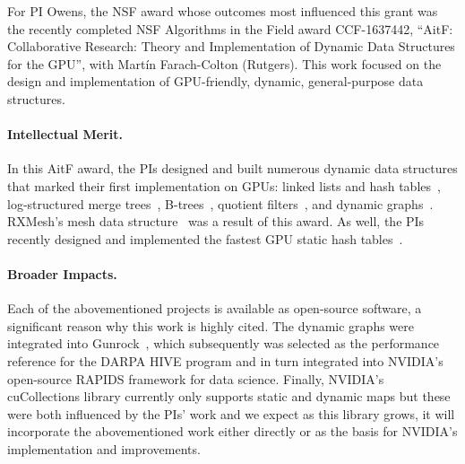 For PI Owens, the NSF award whose outcomes most influenced this grant was the recently completed NSF Algorithms in the Field award CCF-1637442, ``AitF: Collaborative Research: Theory and Implementation of Dynamic Data Structures for the GPU'', with Mart\'{i}n Farach-Colton (Rutgers). This work focused on the design and implementation of GPU-friendly, dynamic, general-purpose data structures.

\paragraph{Intellectual Merit.} In this AitF award, the PIs designed and built numerous dynamic data structures that marked their first implementation on GPUs: linked lists and hash tables~\cite{Ashkiani:2018:ADH}, log-structured merge trees~\cite{Ashkiani:2018:GLA}, B-trees~\cite{Awad:2019:EAH}, quotient filters~\cite{Geil:2018:QFA}, and dynamic graphs~\cite{Awad:2020:DGO}. RXMesh's mesh data structure~\cite{Mahmoud:2021:RAG} was a result of this award. As well, the PIs recently designed and implemented the fastest GPU static hash tables~\cite{Awad:2023:AAI}.

\paragraph{Broader Impacts.} Each of the abovementioned projects is available as open-source software, a significant reason why this work is highly cited. The dynamic graphs were integrated into Gunrock~\cite{Awad:2020:DGO,Wang:2017:GGG}, which subsequently was selected as the performance reference for the DARPA HIVE program and in turn integrated into NVIDIA's open-source RAPIDS framework for data science. Finally, NVIDIA's cuCollections library currently only supports static and dynamic maps but these were both influenced by the PIs' work and we expect as this library grows, it will incorporate the abovementioned work either directly or as the basis for NVIDIA's implementation and improvements.



\fi